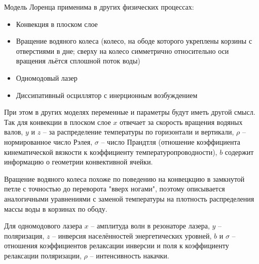 \documentclass[12pt]{article}
\begin{document}
Модель Лоренца применима в других физических процессах:
\begin{itemize}
	\item Конвекция в плоском слое
	\item Вращение водяного колеса (колесо, на ободе которого укреплены корзины с отверстиями в дне; сверху на колесо симметрично относительно оси вращения льётся сплошной поток воды)
	\item Одномодовый лазер
	\item Диссипативный осциллятор с инерционным возбуждением
\end{itemize}

При этом в других моделях переменные и параметры будут иметь другой смысл. Так для конвекции в плоском слое $x$ отвечает за скорость вращения водяных валов, $y$ и $z$ -- за распределение температуры по горизонтали и вертикали, $\rho$ -- нормированное число Рэлея, $\sigma$ -- число Прандтля (отношение коэффициента кинематической вязкости к коэффициенту температуропроводности), $b$ содержит информацию о геометрии конвективной ячейки. 

Вращение водяного колеса похоже по поведению на конвецкцию в замкнутой петле с точностью до переворота "вверх ногами", поэтому описывается аналогичными уравнениями с заменой температуры на плотность распределения массы воды в корзинах по ободу.

Для одномодового лазера $x$ -- амплитуда волн в резонаторе лазера, $y$ -- поляризация, $z$ -- инверсия населённостей энергетических уровней, $b$ и $\sigma$ -- отношения коэффициентов релаксации инверсии и поля к коэффициенту релаксации поляризации, $\rho$ -- интенсивность накачки.
\end{document}
